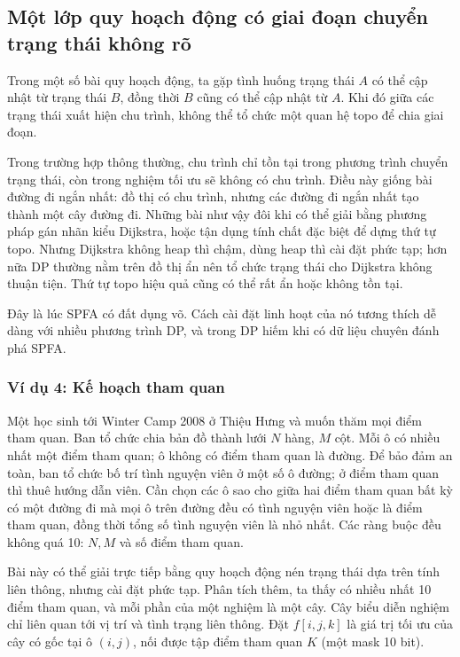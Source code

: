 \documentclass[11pt]{article}
\begin{document}
\subsection{Một lớp quy hoạch động có giai đoạn chuyển trạng thái không rõ}

Trong một số bài quy hoạch động, ta gặp tình huống trạng thái \(A\) có thể
cập nhật từ trạng thái \(B\), đồng thời \(B\) cũng có thể cập nhật từ \(A\).
Khi đó giữa các trạng thái xuất hiện chu trình, không thể tổ chức một quan hệ
topo để chia giai đoạn.

Trong trường hợp thông thường, chu trình chỉ tồn tại trong phương trình
chuyển trạng thái, còn trong nghiệm tối ưu sẽ không có chu trình. Điều này
giống bài đường đi ngắn nhất: đồ thị có chu trình, nhưng các đường đi ngắn
nhất tạo thành một cây đường đi. Những bài như vậy đôi khi có thể giải bằng
phương pháp gán nhãn kiểu Dijkstra, hoặc tận dụng tính chất đặc biệt để dựng
thứ tự topo. Nhưng Dijkstra không heap thì chậm, dùng heap thì cài đặt phức
tạp; hơn nữa DP thường nằm trên đồ thị ẩn nên tổ chức trạng thái cho
Dijkstra không thuận tiện. Thứ tự topo hiệu quả cũng có thể rất ẩn hoặc không
tồn tại.

Đây là lúc SPFA có đất dụng võ. Cách cài đặt linh hoạt của nó tương thích dễ
dàng với nhiều phương trình DP, và trong DP hiếm khi có dữ liệu chuyên đánh
phá SPFA.

\subsubsection*{Ví dụ 4: Kế hoạch tham quan}

Một học sinh tới Winter Camp 2008 ở Thiệu Hưng và muốn thăm mọi điểm tham
quan. Ban tổ chức chia bản đồ thành lưới \(N\) hàng, \(M\) cột. Mỗi ô có
nhiều nhất một điểm tham quan; ô không có điểm tham quan là đường. Để bảo đảm
an toàn, ban tổ chức bố trí tình nguyện viên ở một số ô đường; ở điểm tham
quan thì thuê hướng dẫn viên. Cần chọn các ô sao cho giữa hai điểm tham quan
bất kỳ có một đường đi mà mọi ô trên đường đều có tình nguyện viên hoặc là
điểm tham quan, đồng thời tổng số tình nguyện viên là nhỏ nhất. Các ràng buộc
đều không quá 10: \(N,M\) và số điểm tham quan.

Bài này có thể giải trực tiếp bằng quy hoạch động nén trạng thái dựa trên
tính liên thông, nhưng cài đặt phức tạp. Phân tích thêm, ta thấy có nhiều
nhất 10 điểm tham quan, và mỗi phần của một nghiệm là một cây. Cây biểu diễn
nghiệm chỉ liên quan tới vị trí và tình trạng liên thông. Đặt \(f[i,j,k]\) là
giá trị tối ưu của cây có gốc tại ô \((i,j)\), nối được tập điểm tham quan
\(K\) (một mask 10 bit).
\end{document}
